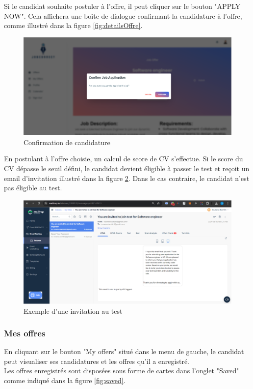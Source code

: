 Si le candidat souhaite postuler à l'offre, il peut cliquer 
sur le  bouton "APPLY NOW". Cela affichera une boîte de 
dialogue confirmant la candidature à l'offre, comme illustré
dans la figure \ref{fig:detailsOffre}.
\newline

\begin{figure}[htbp]
   \centering
   \includegraphics[scale=0.2]{screens/confirmJob2.png} 
   \caption{Confirmation de candidature}
   \label{fig:listOffers}
\end{figure}


En postulant à l'offre choisie, un calcul de score de CV s'effectue. 
Si le score du CV dépasse le seuil défini, le candidat devient éligible à passer 
le test et reçoit un email d'invitation illustré dans la figure \ref{fig:inviteTest}. Dans le cas contraire, le candidat n'est 
pas éligible au test.
\vspace{5cm}
\begin{figure}[htbp]
   \centering
   \includegraphics[scale=0.25]{screens/testInvitation.png} 
   \caption{Exemple d'une invitation au test}
   \label{fig:inviteTest}
\end{figure}

\subsubsection{Mes offres}
En cliquant sur le bouton "My offers" situé dans 
le  menu de  gauche, le candidat peut visualiser ses candidatures et les offres qu'il a enregistré. \\
Les offres enregistrés sont disposées sous forme de cartes dans l'onglet "Saved" comme indiqué dans la figure \ref{fig:saved}.
\\

